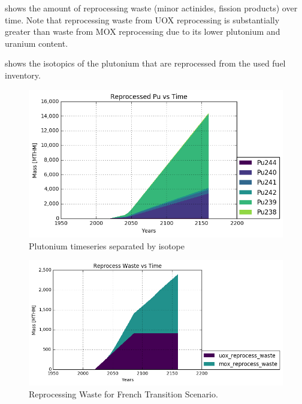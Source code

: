  shows the amount of reprocessing waste
(minor actinides, fission products) over time. Note that 
reprocessing waste from \gls{UOX} reprocessing is substantially
greater than waste from \gls{MOX} reprocessing due to its lower
plutonium and uranium content.

 shows the isotopics of the plutonium that are
reprocessed from the used fuel inventory.

\begin{figure}[htbp!]
	\begin{center}
		\includegraphics[scale=0.7]{./images/french-transition/rep_pu.png}
	\end{center}
	\caption{Plutonium timeseries separated by isotope}
	\label{fig:pu_isotopics}
\end{figure}

\begin{figure}[htbp!]
	\begin{center}
		\includegraphics[scale=0.7]{./images/french-transition/reprocess_waste.png}
	\end{center}
	\caption{Reprocessing Waste for French Transition Scenario.}
	\label{fig:reprocess_waste}
\end{figure}


